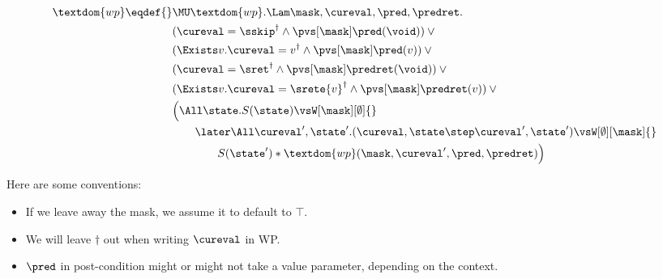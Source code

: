 \begin{align*}
  \textdom{wp} \eqdef{}& \MU \textdom{wp}. \Lam \mask, \cureval, \pred, \predret. \\
        & (\cureval = \sskip^\dag \land \pvs[\mask] \pred(\void)) \lor {}\\
        & (\Exists v. \cureval = v^\dag \land \pvs[\mask] \pred (v)) \lor {}\\
        & (\cureval = \sret^\dag \land \pvs[\mask] \predret (\void)) \lor {}\\
        & (\Exists v. \cureval = \srete{v}^\dag \land \pvs[\mask] \predret (v)) \lor {}\\
        & \Bigl(\All \state. S(\state) \vsW[\mask][\emptyset] {}\\
        &\qquad \later\All \cureval', \state'. (\cureval, \state \step \cureval', \state') \vsW[\emptyset][\mask] {}\\
        &\qquad\qquad S(\state') * \textdom{wp}(\mask, \cureval', \pred, \predret)\Bigr) \\
\end{align*}

Here are some conventions:

\begin{itemize}
\item If we leave away the mask, we assume it to default to $\top$.
\item We will leave $\dag$ out when writing $\cureval$ in WP.
\item $\pred$ in post-condition might or might not take a value parameter, depending on the context.
\end{itemize}

